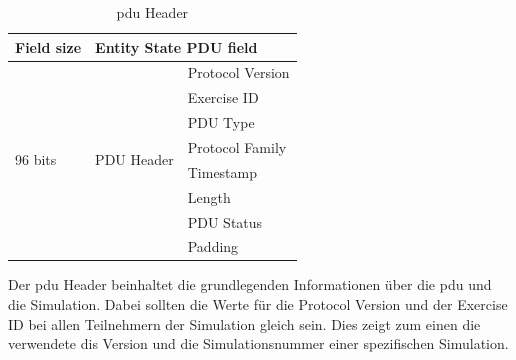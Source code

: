 \begin{table}[H]
	\centering
	\begin{tabular}{|l|c|l|}
		\hline
		\multicolumn{1}{|c|}{Field size} & \multicolumn{2}{l|}{Entity State PDU field}    \\ \hline
		\multirow{8}{*}{96 bits}        & \multirow{8}{*}{PDU Header} & Protocol Version \\ \cline{3-3} 
		&                             & Exercise ID      \\ \cline{3-3} 
		&                             & PDU Type         \\ \cline{3-3} 
		&                             & Protocol Family  \\ \cline{3-3} 
		&                             & Timestamp        \\ \cline{3-3} 
		&                             & Length           \\ \cline{3-3} 
		&                             & PDU Status       \\ \cline{3-3} 
		&                             & Padding          \\ \hline
	\end{tabular}
\caption[\ac{pdu} Header]{\ac{pdu} Header\cite{SISOStandardsActivityCommitteeoftheIEEEComputerSociety.}}
\label{header}
\end{table}
Der \ac{pdu} Header beinhaltet die grundlegenden Informationen über die \ac{pdu} und die Simulation. Dabei sollten die Werte für die \glqq Protocol Version\grqq{} und der \grqq Exercise ID\glqq{} bei allen Teilnehmern der Simulation gleich sein. Dies zeigt zum einen die verwendete \ac{dis} Version und die Simulationsnummer einer spezifischen Simulation.   


